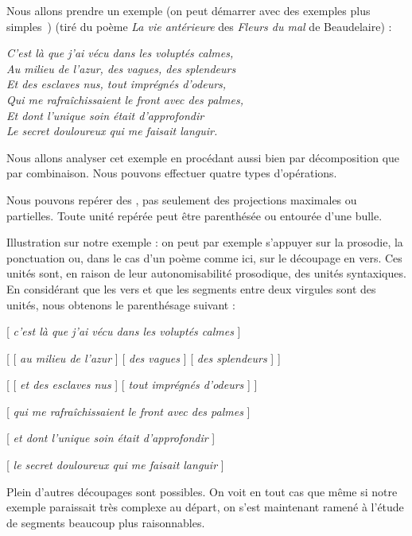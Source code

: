 Nous allons prendre un exemple (on peut démarrer avec des exemples plus simples~\HappySmiley) (tiré du poème \textit{La vie antérieure} des \textit{Fleurs du mal} de Beaudelaire) :

\ea\label{ex:beaudelaire}
\itshape
C’est là que j’ai vécu dans les voluptés calmes,\\
Au milieu de l’azur, des vagues, des splendeurs\\
Et des esclaves nus, tout imprégnés d’odeurs,\\
Qui me rafraîchissaient le front avec des palmes,\\
Et dont l’unique soin était d’approfondir\\
Le secret douloureux qui me faisait languir.
\z

Nous allons analyser cet exemple en procédant aussi bien par décomposition que par combinaison. Nous pouvons effectuer quatre types d’opérations.

\begin{tblsframed}{}
\noindent Nous pouvons repérer des , pas seulement des projections maximales ou partielles. Toute unité repérée peut être parenthésée ou entourée d’une bulle.
\end{tblsframed}

Illustration sur notre exemple : on peut par exemple s’appuyer sur la prosodie, la ponctuation ou, dans le cas d’un poème comme ici, sur le découpage en vers. Ces unités sont, en raison de leur autonomisabilité prosodique, des unités syntaxiques. En considérant que les vers et que les segments entre deux virgules sont des unités, nous obtenons le parenthésage suivant :

\ea{}
[ \textit{c’est là que j’ai vécu dans les voluptés calmes} ]

[ [ \textit{au milieu de l’azur} ] [ \textit{des vagues} ] [ \textit{des splendeurs} ] ]

[ [ \textit{et des esclaves nus} ] [ \textit{tout imprégnés d’odeurs} ] ]

[ \textit{qui me rafraîchissaient le front avec des palmes} ]

[ \textit{et dont l’unique soin était d’approfondir} ]

[ \textit{le secret douloureux qui me faisait languir} ]
\z

Plein d’autres découpages sont possibles. On voit en tout cas que même si notre exemple paraissait très complexe au départ, on s’est maintenant ramené à l’étude de segments beaucoup plus raisonnables.

